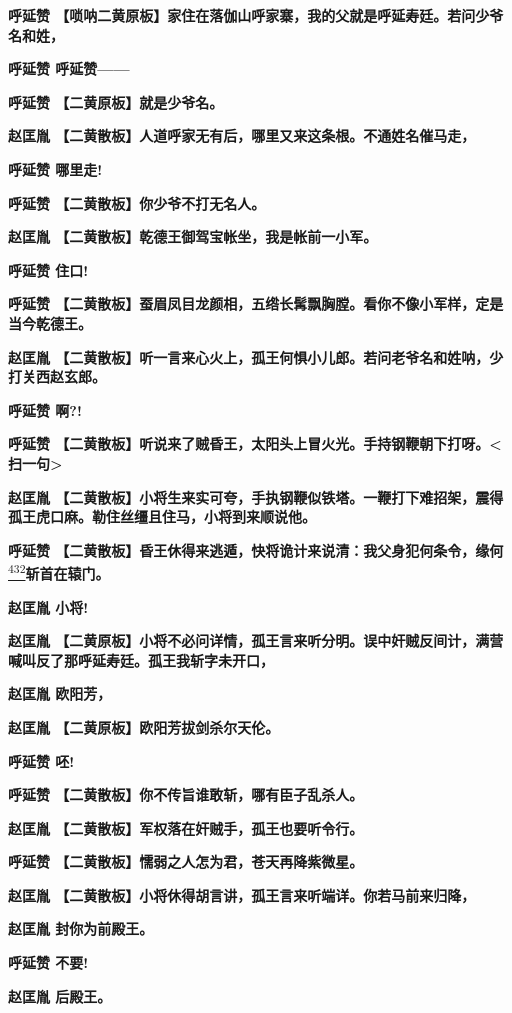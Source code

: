 \textbf{呼延赞
【唢呐二黄原板】家住在落伽山呼家寨，我的父就是呼延寿廷。若问少爷名和姓，}

\textbf{呼延赞 呼延赞------}

\textbf{呼延赞 【二黄原板】就是少爷名。}

\textbf{赵匡胤
【二黄散板】人道呼家无有后，哪里又来这条根。不通姓名催马走，}

\textbf{呼延赞 哪里走!}

\textbf{呼延赞 【二黄散板】你少爷不打无名人。}

\textbf{赵匡胤 【二黄散板】乾德王御驾宝帐坐，我是帐前一小军。}

\textbf{呼延赞 住口!}

\textbf{呼延赞
【二黄散板】蚕眉凤目龙颜相，五绺长髯飘胸膛。看你不像小军样，定是当今乾德王。}

\textbf{赵匡胤
【二黄散板】听一言来心火上，孤王何惧小儿郎。若问老爷名和姓呐，少打关西赵玄郎。}

\textbf{呼延赞 啊?!}

\textbf{呼延赞
【二黄散板】听说来了贼昏王，太阳头上冒火光。手持钢鞭朝下打呀。\textless{}扫一句\textgreater{}}

\textbf{赵匡胤
【二黄散板】小将生来实可夸，手执钢鞭似铁塔。一鞭打下难招架，震得孤王虎口麻。勒住丝缰且住马，小将到来顺说他。}

\textbf{呼延赞
【二黄散板】昏王休得来逃遁，快将诡计来说清：我父身犯何条令，缘何}\protect\hyperlink{fn432}{\textsuperscript{432}}\textbf{斩首在辕门。}

\textbf{赵匡胤 小将!}

\textbf{赵匡胤
【二黄原板】小将不必问详情，孤王言来听分明。误中奸贼反间计，满营喊叫反了那呼延寿廷。孤王我斩字未开口，}

\textbf{赵匡胤 欧阳芳，}

\textbf{赵匡胤 【二黄原板】欧阳芳拔剑杀尔天伦。}

\textbf{呼延赞 呸!}

\textbf{呼延赞 【二黄散板】你不传旨谁敢斩，哪有臣子乱杀人。}

\textbf{赵匡胤 【二黄散板】军权落在奸贼手，孤王也要听令行。}

\textbf{呼延赞 【二黄散板】懦弱之人怎为君，苍天再降紫微星。}

\textbf{赵匡胤
【二黄散板】小将休得胡言讲，孤王言来听端详。你若马前来归降，}

\textbf{赵匡胤 封你为前殿王。}

\textbf{呼延赞 不要!}

\textbf{赵匡胤 后殿王。}

